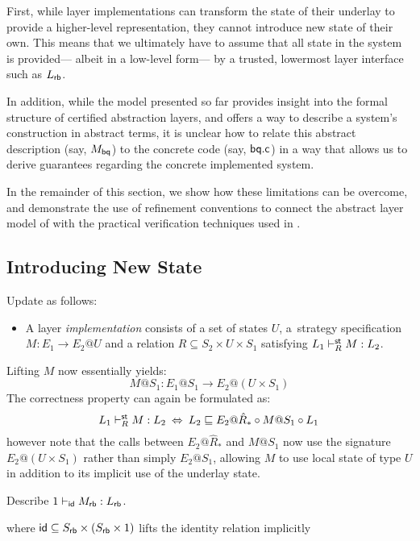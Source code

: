 \documentclass[sigplan,10pt,authordraft]{acmart}
\begin{document}
First,
while layer implementations
can transform the state of their underlay
to provide a higher-level representation,
they cannot introduce new state of their own.
This means that we ultimately have to assume that
all state in the system is provided---%
albeit in a low-level form---%
by a trusted, lowermost layer interface
such as $L_{ \mathsf{rb} }$.

In addition,
while the model presented so far
provides insight into the formal structure
of certified abstraction layers,
and offers a way to describe a system's construction
in abstract terms,
it is unclear how to relate
this abstract description (say, $M_{ \mathsf{bq} }$)
to the concrete code (say, $ \mathsf{bq.c} $)
in a way that allows us to derive guarantees
regarding the concrete implemented system.

In the remainder of this section,
we show how these limitations can be overcome,
and demonstrate the use of refinement conventions
to connect the abstract layer model of \citet{rbgs-cal}
with the practical verification techniques
used in \citet{popl15}.



\subsection{Introducing New State} %

Update as follows:
\begin{itemize}
  \item A layer \emph{implementation} consists of
    a set of states $U$,
    a~strategy specification $M : E_1 \rightarrow E_2@U$
    and a relation $R \subseteq S_2 \times U \times S_1$
    satisfying $L_1 \vdash^{ \mathsf{st} }_R M : L_2$.
\end{itemize}
Lifting $M$ now essentially yields:
\[
  M@S_1 : E_1@S_1 \rightarrow E_2@(U \times S_1)
\]
The correctness property can again be formulated as:
\[
  L_1 \vdash^{ \mathsf{st} }_R M : L_2
  \:\Leftrightarrow\:
  L_2 \sqsubseteq
  E_2@\hat{R}_* \circ M@S_1 \circ L_1
  \,
\]
however note that the calls between $E_2@\hat{R}_*$ and $M@S_1$
now use the signature $E_2@(U \times S_1)$
rather than simply $E_2@S_1$,
allowing $M$ to use local state of type $U$
in addition to its implicit use of the underlay state.

\begin{example}
  Describe $1 \vdash_{ \mathsf{id} } M_{ \mathsf{rb} } : L_{ \mathsf{rb} }$.

  where
  $ \mathsf{id} \subseteq S_{ \mathsf{rb} } \times (S_{ \mathsf{rb} } \times 1)$ lifts the identity
  relation implicitly
\end{example}
\end{document}
